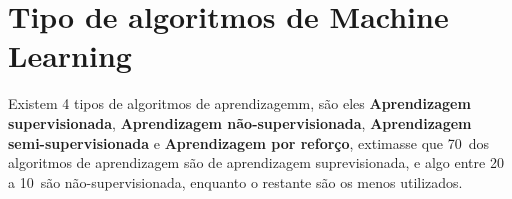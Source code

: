 \section{Tipo de algoritmos de Machine Learning}
\label{sec:ml-types}

Existem 4 tipos de algoritmos de aprendizagemm, são eles \textbf{Aprendizagem supervisionada}, \textbf{Aprendizagem não-supervisionada},
\textbf{Aprendizagem semi-supervisionada} e \textbf{Aprendizagem por reforço}, extimasse que 70\ dos algoritmos de aprendizagem são de 
aprendizagem suprevisionada, e algo entre 20 a 10\ são não-supervisionada, enquanto o restante são os menos utilizados.




